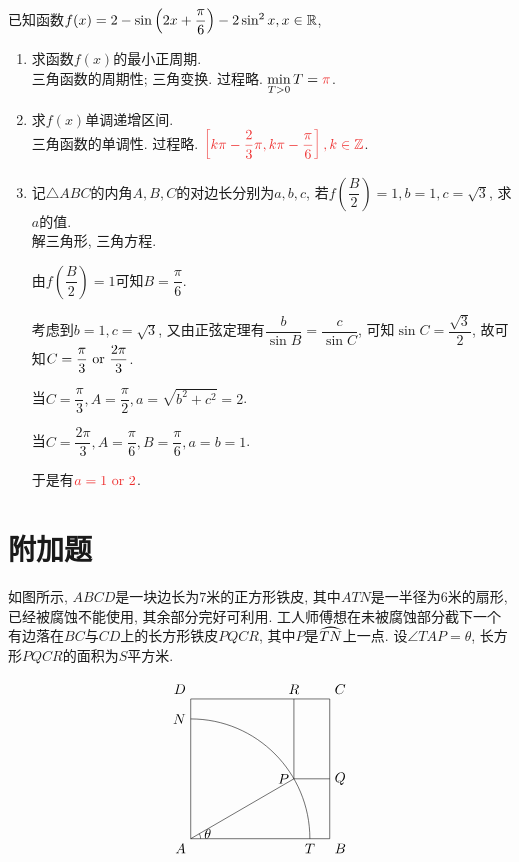\documentclass[8pt]{article}
\begin{document}
		已知函数$f(x)=2-\sin \left(2x+\dfrac{\pi}{6}\right)-2\sin^2 x, x\in \mathbb{R}$,

		\begin{enumerate}[label=(\arabic*)]
			\item 求函数$f(x)$的最小正周期.
				~\\

				三角函数的周期性; 三角变换. 过程略. $\displaystyle \min_{T>0}T=\ansmath{\pi}$.

			\item 求$f(x)$单调递增区间.
				~\\

				三角函数的单调性. 过程略. $\displaystyle\ansmath{\left[k\pi - \frac{2}{3}\pi, k\pi - \frac{\pi}{6}\right], k\in \ZZ}$.

			\item 记$\triangle ABC$的内角$A, B, C$的对边长分别为$a, b, c$, 若$f\left(\dfrac{B}{2}\right)=1, b=1, c=\sqrt{3}$, 求$a$的值.
				~\\

				解三角形, 三角方程.

				由$f\left(\dfrac{B}{2}\right)=1$可知$B=\dfrac{\pi}{6}$.

				考虑到$b=1, c=\sqrt{3}$, 又由正弦定理有$\dfrac{b}{\sin B}=\dfrac{c}{\sin C}$, 可知$\sin C=\dfrac{\sqrt{3}}{2}$, 故可知$C=\dfrac{\pi}{3} \text{ or } \dfrac{2\pi}{3}$.

				当$C=\dfrac{\pi}{3}, A=\dfrac{\pi}{2}, a=\sqrt{b^2+c^2}=2$.

				当$C=\dfrac{2\pi}{3}, A=\dfrac{\pi}{6}, B=\dfrac{\pi}{6}, a=b=1$.

				于是有$\ansmath{a=1 \lgor 2}$.
		\end{enumerate}

	\section{附加题}
		如图所示, $ABCD$是一块边长为$7$米的正方形铁皮, 其中$ATN$是一半径为$6$米的扇形, 已经被腐蚀不能使用, 其余部分完好可利用. 工人师傅想在未被腐蚀部分截下一个有边落在$BC$与$CD$上的长方形铁皮$PQCR$, 其中$P$是$\arc{TN}$上一点. 设$\angle TAP = \theta$, 长方形$PQCR$的面积为$S$平方米.
		
		$$
		\begin{tikzpicture}[scale=0.5, baseline=0]
    		\draw[black] (0, 0)--(7, 0)--(7, 7)--(0, 7)--(0, 0) node at (0, 0) [anchor=north east] {$A$} node at (7, 0) [anchor=north west] {$B$} node at (7, 7) [anchor=south west] {$C$} node at (0, 7) [anchor=south east] {$D$};
    		\draw[black] (6, 0) arc[start angle=0, end angle=90, radius=6] node at (6, 0) [anchor=north] {$T$} node at (0, 6) [anchor=east] {$N$};
    		\draw[black] (0.5, 0) arc[start angle=0, end angle=30, radius=0.5] node [right] {$\theta$};
    		\draw[black] (0, 0)--({3*sqrt(3)}, 3) node at ({3*sqrt(3)}, 3) [anchor=east]{$P$};
    		\draw[black] ({3*sqrt(3)}, 7)--({3*sqrt(3)}, 3)--(7, 3) node at ({3*sqrt(3)}, 7) [anchor=south] {$R$} node at (7, 3) [anchor=west] {$Q$};
    	\end{tikzpicture}
    	$$
\end{document}
